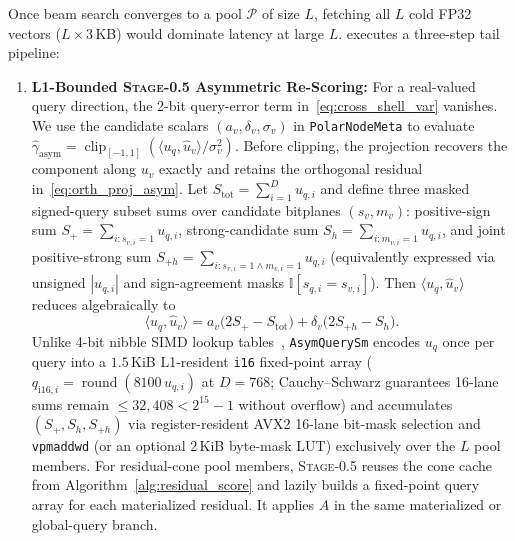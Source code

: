 Once beam search converges to a pool $\mathcal{P}$ of size $L$, fetching all $L$ cold FP32 vectors ($L \times 3$\,KB) would dominate latency at large $L$.
\rquiver{} executes a three-step tail pipeline:
\begin{enumerate}
  \item \textbf{L1-Bounded \textsc{Stage-0.5} Asymmetric Re-Scoring:}
  For a real-valued query direction, the 2-bit query-error term in~\eqref{eq:cross_shell_var} vanishes. We use the candidate scalars $(a_v,\delta_v,\sigma_v)$ in \texttt{PolarNodeMeta} to evaluate $\hat{\gamma}_{\mathrm{asym}}=\operatorname{clip}_{[-1,1]}(\langle u_q,\hat u_v\rangle/\sigma_v^2)$. Before clipping, the projection recovers the component along $u_v$ exactly and retains the orthogonal residual in~\eqref{eq:orth_proj_asym}.
  Let $S_{\mathrm{tot}} = \sum_{i=1}^D u_{q,i}$ and define three masked signed-query subset sums over candidate bitplanes $(s_v, m_v)$: positive-sign sum $S_+ = \sum_{i : s_{v,i} = 1} u_{q,i}$, strong-candidate sum $S_h = \sum_{i : m_{v,i} = 1} u_{q,i}$, and joint positive-strong sum $S_{+h} = \sum_{i : s_{v,i} = 1 \land m_{v,i} = 1} u_{q,i}$ (equivalently expressed via unsigned $|u_{q,i}|$ and sign-agreement masks $\mathbb{I}[s_{q,i}=s_{v,i}]$).
  Then $\langle u_q, \hat{u}_v\rangle$ reduces algebraically to
  \begin{equation}
    \langle u_q, \hat{u}_v\rangle = a_v\bigl(2 S_+ - S_{\mathrm{tot}}\bigr) + \delta_v\bigl(2 S_{+h} - S_h\bigr).
    \label{eq:asym_subset_sums}
  \end{equation}
  Unlike 4-bit nibble {SIMD} lookup tables~\cite{andre2015cache,andre2017accelerated,trent2024bbq}, \texttt{AsymQuerySm} encodes $u_q$ once per query into a $1.5$\,KiB L1-resident \texttt{i16} fixed-point array ($q_{\mathrm{i16},i} = \operatorname{round}(8100\,u_{q,i})$ at $D=768$; Cauchy--Schwarz guarantees 16-lane sums remain $\le32{,}408<2^{15}-1$ without overflow) and accumulates $(S_+, S_h, S_{+h})$ via register-resident {AVX2} 16-lane bit-mask selection and \texttt{vpmaddwd} (or an optional $2$\,KiB byte-mask {LUT}) exclusively over the $L$ pool members.
  For residual-cone pool members, \textsc{Stage-0.5} reuses the cone cache from Algorithm~\ref{alg:residual_score} and lazily builds a fixed-point query array for each materialized residual. It applies $A$ in the same materialized or global-query branch.


\end{enumerate}
